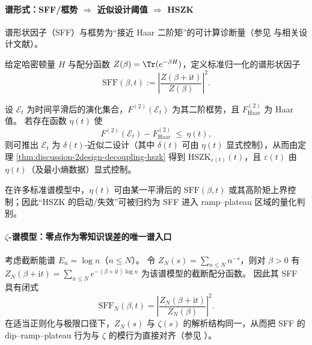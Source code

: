 \paragraph{谱形式：SFF/框势 \texorpdfstring{$\Rightarrow$}{=>} 近似设计阈值 \texorpdfstring{$\Rightarrow$}{=>} HSZK}
谱形状因子（SFF）与框势为“接近 Haar 二阶矩”的可计算诊断量（参见 \cite{Liu2018SpectralFormFactors} 与相关设计文献）。

\begin{definition}\label{def:discussion-sff}
给定哈密顿量 \(H\) 与配分函数 \(Z(\beta)=\Tr(e^{-\beta H})\)，定义标准归一化的谱形状因子
\[
\mathrm{SFF}(\beta,t):=\left|\frac{Z(\beta+\mathrm{i}t)}{Z(\beta)}\right|^2.
\]
\end{definition}

\begin{proposition}\label{prop:discussion-framepotential-sff-to-hszk}
设 \(\mathcal{E}_t\) 为时间平滑后的演化集合，\(F^{(2)}(\mathcal{E}_t)\) 为其二阶框势，且 \(F^{(2)}_{\mathrm{Haar}}\) 为 Haar 值。
若存在函数 \(\eta(t)\) 使
\[
F^{(2)}(\mathcal{E}_t)-F^{(2)}_{\mathrm{Haar}}\ \le\ \eta(t),
\]
则可推出 \(\mathcal{E}_t\) 为 \(\delta(t)\)-近似二设计（其中 \(\delta(t)\) 可由 \(\eta(t)\) 显式控制），从而由定理 \ref{thm:discussion-2design-decoupling-hszk} 得到
\(\mathrm{HSZK}_{\varepsilon(t)}(t)\)，且 \(\varepsilon(t)\) 由 \(\eta(t)\)（及最小熵数据）显式控制。
\par
在许多标准谱模型中，\(\eta(t)\) 可由某一平滑后的 \(\mathrm{SFF}(\beta,t)\) 或其高阶矩上界控制；因此“HSZK 的启动/失效”可被归约为 SFF 进入 ramp--plateau 区域的量化判别。
\end{proposition}

\paragraph{\texorpdfstring{$\zeta$}{zeta}-谱模型：零点作为零知识误差的唯一谱入口}
考虑截断能谱 \(E_n=\log n\)（\(n\le N\)）。
令
\(
Z_N(s)=\sum_{n\le N}n^{-s}
\)，则对 \(\beta>0\) 有
\(
Z_N(\beta+\mathrm{i}t)=\sum_{n\le N}e^{-(\beta+\mathrm{i}t)\log n}
\)
为该谱模型的截断配分函数。
因此其 SFF 具有闭式
\[
\mathrm{SFF}_N(\beta,t)=\left|\frac{Z_N(\beta+\mathrm{i}t)}{Z_N(\beta)}\right|^2.
\]
在适当正则化与极限口径下，\(Z_N(s)\) 与 \(\zeta(s)\) 的解析结构同一，从而把 SFF 的 dip--ramp--plateau 行为与 \(\zeta\) 的模行为直接对齐（参见 \cite{BasuDasKrishnan2025AnalyticZetaRamp}）。

